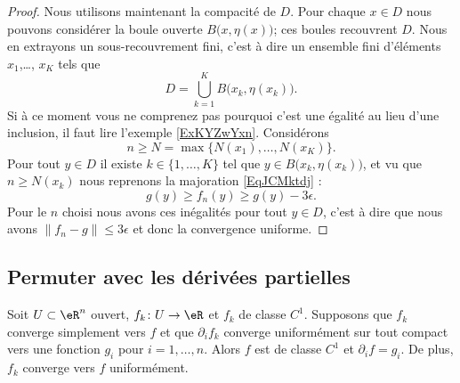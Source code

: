 \begin{proof}
    Nous utilisons maintenant la compacité de \( D\). Pour chaque \( x\in D\) nous pouvons considérer la boule ouverte \( B\big( x,\eta(x) \big)\); ces boules recouvrent \( D\). Nous en extrayons un sous-recouvrement fini, c'est à dire un ensemble fini d'éléments \( x_1\),\ldots, \( x_K\) tels que
    \begin{equation}
        D=\bigcup_{k=1}^K B\big(x_k,\eta(x_k)\big).
    \end{equation}
    Si à ce moment vous ne comprenez pas pourquoi c'est une égalité au lieu d'une inclusion, il faut lire l'exemple \ref{ExKYZwYxn}. Considérons 
    \begin{equation}
        n\geq N=\max\{ N(x_1),\ldots, N(x_K) \}.
    \end{equation}
    Pour tout \( y\in D\) il existe \( k\in\{ 1,\ldots, K \}\) tel que \( y\in B\big( x_k,\eta(x_k) \big)\), et vu que \( n\geq N(x_k)\) nous reprenons la majoration \eqref{EqJCMktdj} :
    \begin{equation}
        g(y)\geq f_n(y)\geq g(y)-3\epsilon.
    \end{equation}
    Pour le \( n\) choisi nous avons ces inégalités pour tout \( y\in D\), c'est à dire que nous avons \( \| f_n-g \|\leq 3\epsilon\) et donc la convergence uniforme.
\end{proof}

\subsection{Permuter avec les dérivées partielles}

\begin{theorem}		\label{ThoSerUnifDerr}
	Soit $U\subset\eR^n$ ouvert, $f_k\colon U\to \eR$ et $f_k$ de classe $C^1$. Supposons que $f_k$ converge simplement vers $f$ et que $\partial_if_k$ converge uniformément sur tout compact  vers une fonction $g_i$ pour $i=1,\ldots,n$. Alors $f$ est de classe $C^1$ et $\partial_if=g_i$. De plus, $f_k$ converge vers $f$ uniformément.
\end{theorem}



